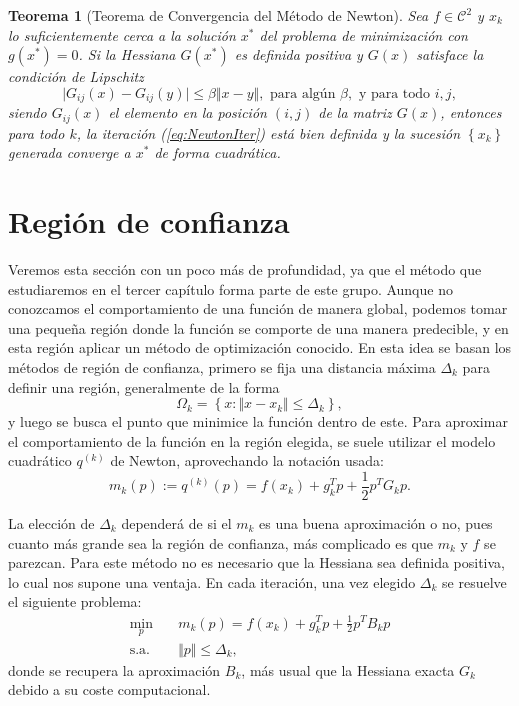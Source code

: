 \documentclass[11pt,a4paper]{book}
\newtheorem{theorem}{Teorema}[chapter]
\theoremstyle{definition}
\theoremstyle{remark}
\begin{document}
\begin{theorem}[Teorema de Convergencia del Método de Newton]
	Sea
	$f \in \mathcal{C}^2$ y $x_k$ lo suficientemente cerca a
	la solución $x^*$ del problema de minimización con
	$g(x^*)=0$. Si la Hessiana $G(x^*)$ es definida positiva y
	$G(x)$ satisface la condición de Lipschitz
	\begin{equation}
		\vert G_{ij}(x) - G_{ij}(y) \vert \leq 
		\beta \Vert x-y \Vert,
		\text{ para algún } \beta,
		\text{ y para todo } i,j,
	\end{equation}
	siendo $G_{ij}(x)$ el elemento en la posición $(i,j)$ de la matriz
	$G(x)$, entonces para todo $k$, la iteración (\ref{eq:NewtonIter})
	está bien definida y la sucesión $\left\{ x_k \right\}$
	generada converge a $x^*$ de forma cuadrática.
\end{theorem}


\section{Región de confianza}\label{sec:tr}

Veremos esta sección con un poco más de profundidad, ya que el método que estudiaremos
en el tercer capítulo forma parte de este grupo. Aunque no conozcamos el comportamiento
de una función de manera global, podemos tomar una pequeña región donde la función se
comporte de una manera predecible, y en esta región aplicar un método de optimización
conocido. En esta idea se basan los métodos de región de confianza, primero se fija una distancia máxima $\Delta_k$ para definir una región,
generalmente de la forma
\begin{equation}
	\Omega_k = \left\{x : \Vert x-x_k \Vert \leq \Delta_k \right\},
\end{equation}
y luego se busca el punto que minimice la función dentro de este.
Para aproximar el comportamiento de la función en la región elegida, 
se suele utilizar el modelo cuadrático $q^{(k)}$ de Newton, aprovechando la notación usada:
\begin{equation}
	m_k(p) := q^{(k)}(p) = f(x_k) + g^T_kp + \frac{1}{2}p^TG_kp.
\end{equation}

La elección de $\Delta_k$ dependerá de si el $m_k$ es una buena aproximación o no, pues cuanto más grande sea la región de confianza, más complicado es que $m_k$ y $f$ se parezcan.
Para este método no es necesario que la Hessiana sea definida positiva,
lo cual nos supone una ventaja.
En cada iteración, una vez elegido $\Delta_k$ se resuelve el siguiente problema:
\begin{equation}
\label{min:tr}
\begin{aligned}
	\min_{p} \quad & m_k(p) = f(x_k) + g^T_kp + \frac{1}{2}p^TB_kp \\
	\text{s.a.} \quad & \Vert p \Vert \leq \Delta_k,
\end{aligned}
\end{equation}
donde se recupera la aproximación $B_k$, más usual que la Hessiana exacta $G_k$ debido a
su coste computacional.
\end{document}
